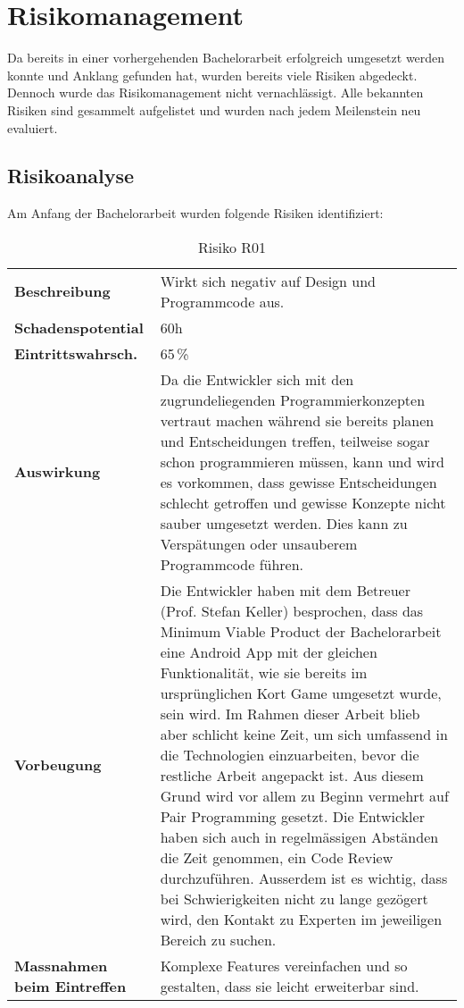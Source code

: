 \section{Risikomanagement}
\label{pm-projektmanagement-risikomanagement}
Da \kort{} bereits in einer vorhergehenden Bachelorarbeit erfolgreich umgesetzt werden konnte und Anklang gefunden hat, wurden bereits viele Risiken abgedeckt.\newline
Dennoch wurde das Risikomanagement nicht vernachlässigt.
Alle bekannten Risiken sind gesammelt aufgelistet und wurden nach jedem Meilenstein neu evaluiert.

\subsection{Risikoanalyse}
\label{pm-projektmanagement-risikoanalyse}
Am Anfang der Bachelorarbeit wurden folgende Risiken identifiziert:

\begin{table}[H]
\centering
\label{pm-projektmanagement-risikomanagement-r01}
\begin{tabular}{|>{\raggedright}p{4.5cm}|p{11cm}|}
\hline
\multicolumn{2}{|l|}{\textbf{R01: Mangelnde Erfahrung mit \brand{JavaScript}, \brand{React} und \brand{React Native}}} \\
\hline
\textbf{Beschreibung} & Wirkt sich negativ auf Design und Programmcode aus. \\
\hline
\textbf{Schadenspotential} & 60h \\
\hline
\textbf{Eintrittswahrsch.} & 65\,\% \\
\hline
\textbf{Auswirkung} & Da die Entwickler sich mit den zugrundeliegenden Programmierkonzepten vertraut machen während sie bereits planen und Entscheidungen treffen, teilweise sogar schon programmieren müssen, kann und wird es vorkommen, dass gewisse Entscheidungen schlecht getroffen und gewisse Konzepte nicht sauber umgesetzt werden. 
Dies kann zu Verspätungen oder unsauberem Programmcode führen. \\
\hline
\textbf{Vorbeugung} & Die Entwickler haben mit dem Betreuer (Prof. Stefan Keller) besprochen, dass das \gls{Minimum Viable Product} der Bachelorarbeit eine Android App mit der gleichen Funktionalität, wie sie bereits im ursprünglichen Kort Game umgesetzt wurde, sein wird.
Im Rahmen dieser Arbeit blieb aber schlicht keine Zeit, um sich umfassend in die Technologien einzuarbeiten, bevor die restliche Arbeit angepackt ist.
Aus diesem Grund wird vor allem zu Beginn vermehrt auf \gls{Pair Programming} gesetzt.
Die Entwickler haben sich auch in regelmässigen Abständen die Zeit genommen, ein Code Review durchzuführen.
Ausserdem ist es wichtig, dass bei Schwierigkeiten nicht zu lange gezögert wird, den Kontakt zu Experten im jeweiligen Bereich zu suchen.  \\
\hline
\textbf{Massnahmen beim Eintreffen} & Komplexe Features vereinfachen und so gestalten, dass sie leicht erweiterbar sind. \\
\hline
\end{tabular}
\caption{Risiko R01}
\end{table}

